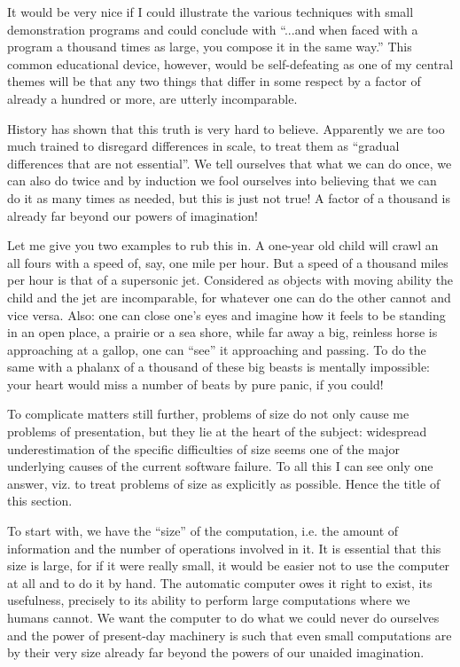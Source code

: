 It would be very nice if I could illustrate the various techniques with small demonstration programs and could conclude with ``...and when faced with a program a thousand times as large, you compose it in the same way.'' This common educational device, however, would be self-defeating as one of my central themes will be that any two things that differ in some respect by a factor of already a hundred or more, are utterly incomparable.

History has shown that this truth is very hard to believe. Apparently we are too much trained to disregard differences in scale, to treat them as ``gradual differences that are not essential''. We tell ourselves that what we can do once, we can also do twice and by induction we fool ourselves into believing that we can do it as many times as needed, but this is just not true! A factor of a thousand is already far beyond our powers of imagination!

Let me give you two examples to rub this in. A one-year old child will crawl an all fours with a speed of, say, one mile per hour. But a speed of a thousand miles per hour is that of a supersonic jet. Considered as objects with moving ability the child and the jet are incomparable, for whatever one can do the other cannot and vice versa. Also: one can close one's eyes and imagine how it feels to be standing in an open place, a prairie or a sea shore, while far away a big, reinless horse is approaching at a gallop, one can ``see'' it approaching and passing. To do the same with a phalanx of a thousand of these big beasts is mentally impossible: your heart would miss a number of beats by pure panic, if you could!

To complicate matters still further, problems of size do not only cause me problems of presentation, but they lie at the heart of the subject: widespread underestimation of the specific difficulties of size seems one of the major underlying causes of the current software failure. To all this I can see only one answer, viz. to treat problems of size as explicitly as possible. Hence the title of this section.

To start with, we have the ``size'' of the computation, i.e. the amount of information and the number of operations involved in it. It is essential that this size is large, for if it were really small, it would be easier not to use the computer at all and to do it by hand. The automatic computer owes it right to exist, its usefulness, precisely to its ability to perform large computations where we humans cannot. We want the computer to do what we could never do ourselves and the power of present-day machinery is such that even small computations are by their very size already far beyond the powers of our unaided imagination.


